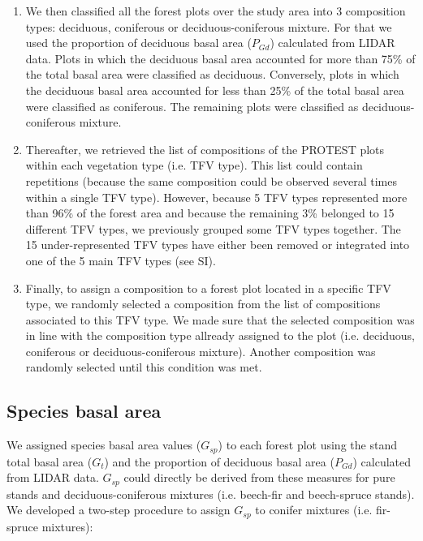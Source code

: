 \documentclass[a4paper]{article}
\begin{document}
\begin{enumerate}
    \item We then classified all the forest plots over the study area into 3 composition types: deciduous, coniferous or deciduous-coniferous mixture. For that we used the proportion of deciduous basal area ($P_{Gd}$) calculated from LIDAR data. Plots in which the deciduous basal area accounted for more than 75\% of the total basal area were classified as deciduous. Conversely, plots in which the deciduous basal area accounted for less than 25\% of the total basal area were classified as coniferous. The remaining plots were classified as deciduous-coniferous mixture.

    \item Thereafter, we retrieved the list of compositions of the PROTEST plots within each vegetation type (i.e. TFV type). This list could contain repetitions (because the same composition could be observed several times within a single TFV type). However, because 5 TFV types represented more than 96\% of the forest area and because the remaining 3\% belonged to 15 different TFV types, we previously grouped some TFV types together. The 15 under-represented TFV types have either been removed or integrated into one of the 5 main TFV types (see SI).

    \item Finally, to assign a composition to a forest plot located in a specific TFV type, we randomly selected a composition from the list of compositions associated to this TFV type. We made sure that the selected composition was in line with the composition type allready assigned to the plot (i.e. deciduous, coniferous or deciduous-coniferous mixture). Another composition was randomly selected until this condition was met.

\end{enumerate}


\subsection*{Species basal area}

\noindent We assigned species basal area values ($G_{sp}$) to each forest plot using the stand total basal area ($G_t$) and the proportion of deciduous basal area ($P_{Gd}$) calculated from LIDAR data. $G_{sp}$ could directly be derived from these measures for pure stands and deciduous-coniferous mixtures (i.e. beech-fir and beech-spruce stands). We developed a two-step procedure to assign $G_{sp}$ to conifer mixtures (i.e. fir-spruce mixtures):
\end{document}
